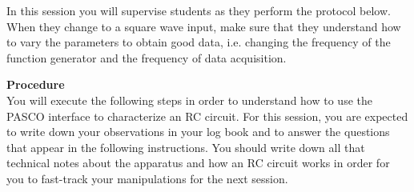 \documentclass[12pt]{report}
\begin{document}
\begin{tcolorbox}[title=Session \#1]
In this session you will supervise students as they perform the protocol below. When they change to a square wave input, make sure that they understand how to vary the parameters to obtain good data, i.e. changing the frequency of the function generator and the frequency of data acquisition.
\end{tcolorbox}

\noindent \large \textbf{Procedure} \normalsize \\
You will execute the following steps in order to understand how to use the PASCO interface to characterize an RC circuit. For this session, you are expected to write down your observations in your log book and to answer the questions that appear in the following instructions. You should write down all that technical notes about the apparatus and how an RC circuit works in order for you to fast-track your manipulations for the next session.
\end{document}
